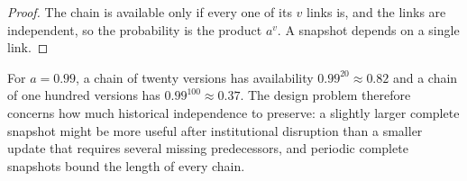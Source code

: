 \begin{proof}
The chain is available only if every one of its $v$ links is, and the links are independent, so the probability is the product $a^{v}$. A snapshot depends on a single link.
\end{proof}

For $a=0.99$, a chain of twenty versions has availability $0.99^{20}\approx0.82$ and a chain of one hundred versions has $0.99^{100}\approx0.37$. The design problem therefore concerns how much historical independence to preserve: a slightly larger complete snapshot might be more useful after institutional disruption than a smaller update that requires several missing predecessors, and periodic complete snapshots bound the length of every chain.
